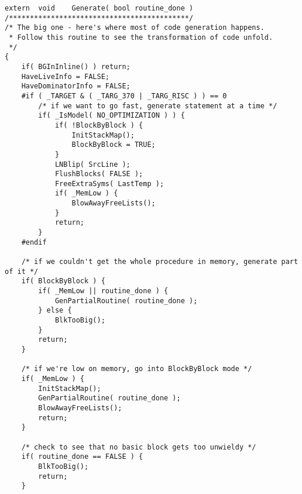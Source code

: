 \begin{lstlisting}[caption=bld\textbackslash{}cg\textbackslash{}c\textbackslash{}generate.c]
extern  void    Generate( bool routine_done )
/*******************************************/
/* The big one - here's where most of code generation happens.
 * Follow this routine to see the transformation of code unfold.
 */
{
    if( BGInInline() ) return;
    HaveLiveInfo = FALSE;
    HaveDominatorInfo = FALSE;
    #if ( _TARGET & ( _TARG_370 | _TARG_RISC ) ) == 0
        /* if we want to go fast, generate statement at a time */
        if( _IsModel( NO_OPTIMIZATION ) ) {
            if( !BlockByBlock ) {
                InitStackMap();
                BlockByBlock = TRUE;
            }
            LNBlip( SrcLine );
            FlushBlocks( FALSE );
            FreeExtraSyms( LastTemp );
            if( _MemLow ) {
                BlowAwayFreeLists();
            }
            return;
        }
    #endif

    /* if we couldn't get the whole procedure in memory, generate part of it */
    if( BlockByBlock ) {
        if( _MemLow || routine_done ) {
            GenPartialRoutine( routine_done );
        } else {
            BlkTooBig();
        }
        return;
    }

    /* if we're low on memory, go into BlockByBlock mode */
    if( _MemLow ) {
        InitStackMap();
        GenPartialRoutine( routine_done );
        BlowAwayFreeLists();
        return;
    }

    /* check to see that no basic block gets too unwieldy */
    if( routine_done == FALSE ) {
        BlkTooBig();
        return;
    }


\end{lstlisting}
